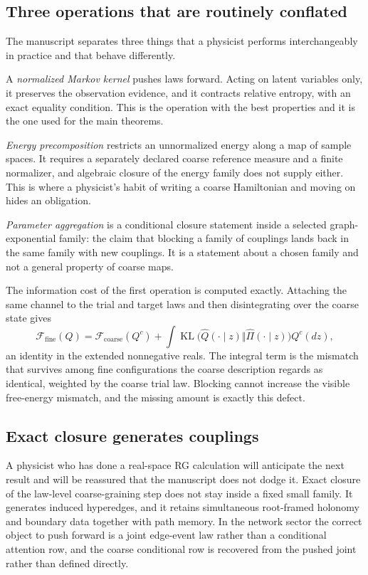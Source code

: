 \documentclass[11pt,letterpaper]{article}
\newcommand{\KL}{\operatorname{KL}}
\begin{document}
\subsection{Three operations that are routinely conflated}

The manuscript separates three things that a physicist performs interchangeably in practice and that behave differently.

A \emph{normalized Markov kernel} pushes laws forward. Acting on latent variables only, it preserves the observation evidence, and it contracts relative entropy, with an exact equality condition. This is the operation with the best properties and it is the one used for the main theorems.

\emph{Energy precomposition} restricts an unnormalized energy along a map of sample spaces. It requires a separately declared coarse reference measure and a finite normalizer, and algebraic closure of the energy family does not supply either. This is where a physicist's habit of writing a coarse Hamiltonian and moving on hides an obligation.

\emph{Parameter aggregation} is a conditional closure statement inside a selected graph-exponential family: the claim that blocking a family of couplings lands back in the same family with new couplings. It is a statement about a chosen family and not a general property of coarse maps.

The information cost of the first operation is computed exactly. Attaching the same channel to the trial and target laws and then disintegrating over the coarse state gives
\begin{equation}
  \mathcal F_{\mathrm{fine}}(Q)=\mathcal F_{\mathrm{coarse}}(Q^c)
  +\int \KL\bigl(\widehat Q(\cdot\mid z)\Vert\widehat\Pi(\cdot\mid z)\bigr)Q^c(dz),
  \label{eq:coarse-vfe}
\end{equation}
an identity in the extended nonnegative reals. The integral term is the mismatch that survives among fine configurations the coarse description regards as identical, weighted by the coarse trial law. Blocking cannot increase the visible free-energy mismatch, and the missing amount is exactly this defect.

\subsection{Exact closure generates couplings}

A physicist who has done a real-space RG calculation will anticipate the next result and will be reassured that the manuscript does not dodge it. Exact closure of the law-level coarse-graining step does not stay inside a fixed small family. It generates induced hyperedges, and it retains simultaneous root-framed holonomy and boundary data together with path memory. In the network sector the correct object to push forward is a joint edge-event law rather than a conditional attention row, and the coarse conditional row is recovered from the pushed joint rather than defined directly.
\end{document}
